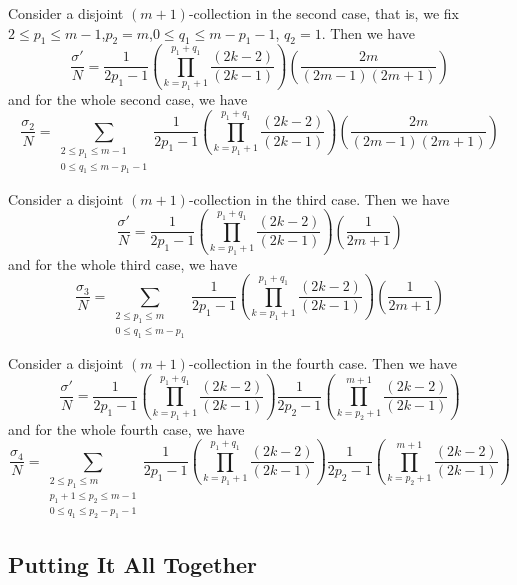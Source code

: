 \documentclass[11pt]{article}
\theoremstyle{mythm}
\begin{document}
Consider a disjoint $(m+1)$-collection in the second case, that is, we fix $2\leq p_1\leq m-1$,$p_2=m$,$0\leq q_1\leq m-p_1-1$, $q_2 = 1$. Then we have
\begin{equation*}
\frac{\sigma'}{N} = \frac{1}{2p_1-1}\left(\prod\limits_{k=p_1+1}^{p_1+q_1}\frac{(2k-2)}{(2k-1)}\right)\left(\frac{2m}{(2m-1)(2m+1)}\right)
\end{equation*}
and for the whole second case, we have
\begin{equation*}
\frac{\sigma_2}{N} = \sum\limits_{\substack{2\leq p_1\leq m-1 \\ 0\leq q_1\leq m-p_1-1}}\frac{1}{2p_1-1}\left(\prod\limits_{k=p_1+1}^{p_1+q_1}\frac{(2k-2)}{(2k-1)}\right)\left(\frac{2m}{(2m-1)(2m+1)}\right)
\end{equation*}

Consider a disjoint $(m+1)$-collection in the third case. Then we have
\begin{equation*}
\frac{\sigma'}{N} = \frac{1}{2p_1-1}\left(\prod\limits_{k=p_1+1}^{p_1+q_1}\frac{(2k-2)}{(2k-1)}\right)\left(\frac{1}{2m+1}\right)
\end{equation*}
and for the whole third case, we have
\begin{equation*}
\frac{\sigma_3}{N} = \sum\limits_{\substack{2\leq p_1\leq m \\ 0\leq q_1\leq m-p_1}}\frac{1}{2p_1-1}\left(\prod\limits_{k=p_1+1}^{p_1+q_1}\frac{(2k-2)}{(2k-1)}\right)\left(\frac{1}{2m+1}\right)
\end{equation*}

Consider a disjoint $(m+1)$-collection in the fourth case. Then we have
\begin{equation*}
\frac{\sigma'}{N} = \frac{1}{2p_1-1}\left(\prod\limits_{k=p_1+1}^{p_1+q_1}\frac{(2k-2)}{(2k-1)}\right)\frac{1}{2p_2-1}\left(\prod\limits_{k=p_2+1}^{m+1}\frac{(2k-2)}{(2k-1)}\right)
\end{equation*}
and for the whole fourth case, we have
\begin{equation*}
\frac{\sigma_4}{N} = \sum\limits_{\substack{2\leq p_1\leq m \\ p_1+1\leq p_2 \leq m-1 \\ 0\leq q_1\leq p_2-p_1-1 }}\frac{1}{2p_1-1}\left(\prod\limits_{k=p_1+1}^{p_1+q_1}\frac{(2k-2)}{(2k-1)}\right)\frac{1}{2p_2-1}\left(\prod\limits_{k=p_2+1}^{m+1}\frac{(2k-2)}{(2k-1)}\right)
\end{equation*}

\subsection{Putting It All Together}
\end{document}
